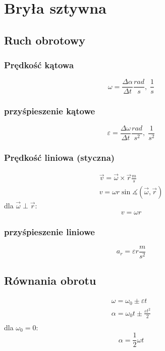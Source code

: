 \chapter{Bryła sztywna}
  \section{Ruch obrotowy}
    \subsection{Prędkość kątowa}
      \begin{equation}
        \omega = \frac{\Delta\alpha}{\Delta t} \unit{\frac{rad}{s},\;\frac{1}{s}}
      \end{equation}
    \subsection{przyśpieszenie kątowe}
      \begin{equation}
        \varepsilon = \frac{\Delta\omega}{\Delta t} \unit{\frac{rad}{s^2},\;\frac{1}{s^2}}
      \end{equation}
    \subsection{Prędkość liniowa (styczna)}
      \begin{gather}
        \vec v = \vec\omega \times \vec r\unit{\frac{m}{s}}\\
        v = \omega r\sin\measuredangle(\vec\omega, \vec r)
      \end{gather}
      dla $\vec\omega \perp \vec r$:
      \begin{equation}
        v =\omega r
      \end{equation}
    \subsection{przyśpieszenie liniowe}
      \begin{equation}
        a_r = \varepsilon r \unit{\frac{m}{s^2}}
      \end{equation}
    \section{Równania obrotu}
      \begin{gather}
        \omega = \omega_0 \pm \varepsilon t\\
        \alpha = \omega_0t \pm \frac{\varepsilon t^2}{2}\\
      \end{gather}
      dla $\omega_0 = 0$:
      \begin{equation}
        \alpha = \frac{1}{2} \omega t
      \end{equation}
